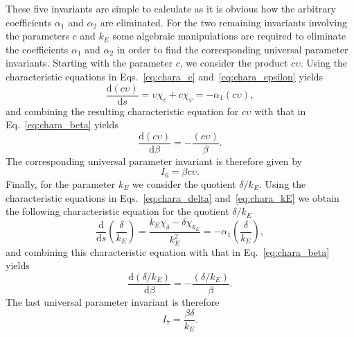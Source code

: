 \documentclass[12pt]{article}
\begin{document}
These five invariants are simple to calculate as it is obvious how the arbitrary coefficients $\alpha_{1}$ and $\alpha_{2}$ are eliminated. For the two remaining invariants involving the parameters $c$ and $k_{E}$ some algebraic manipulations are required to eliminate the coefficients $\alpha_{1}$ and $\alpha_{2}$ in order to find the corresponding universal parameter invariants. Starting with the parameter $c$, we consider the product $c\upsilon$. Using the characteristic equations in Eqs.~\eqref{eq:chara_c} and~\eqref{eq:chara_epsilon} yields
\begin{equation}
  \frac{\mathrm{d}(c\upsilon)}{\mathrm{d}s}=\upsilon\chi_{c}+c\chi_{\upsilon}=-\alpha_{1}(c\upsilon),
  \label{eq:chara_ceps}
\end{equation}
and combining the resulting characteristic equation for $c\upsilon$ with that in Eq.~\eqref{eq:chara_beta} yields
\begin{equation}
  \frac{\mathrm{d}(c\upsilon)}{\mathrm{d}\beta}=-\frac{(c\upsilon)}{\beta}.
  \label{eq:chara_I6}
\end{equation}
The corresponding universal parameter invariant is therefore given by
\begin{equation}
I_{6}=\beta{c}\upsilon.
\label{eq:I6_app}
\end{equation}
Finally, for the parameter $k_{E}$ we consider the quotient $\delta/k_{E}$. Using the characteristic equations in Eqs.~\eqref{eq:chara_delta} and~\eqref{eq:chara_kE} we obtain the following characteristic equation for the quotient $\delta/k_{E}$
\begin{equation}
\frac{\mathrm{d}}{\mathrm{d}s}\left(\frac{\delta}{k_{E}}\right)=\frac{k_{E}\chi_{\delta}-\delta\chi_{k_{E}}}{k_{E}^{2}}=-\alpha_{1}\left(\frac{\delta}{k_{E}}\right),
\label{eq:chara_deltakE}
\end{equation}
and combining this characteristic equation with that in Eq.~\eqref{eq:chara_beta} yields
\begin{equation}
\frac{\mathrm{d}(\delta/k_{E})}{\mathrm{d}\beta}=-\frac{(\delta/k_{E})}{\beta}.
\label{eq:chara_I7}
\end{equation}
The last universal parameter invariant is therefore
\begin{equation}
I_{7}=\frac{\beta\delta}{k_{E}}.
\label{eq:I7_app}
\end{equation}
\end{document}
